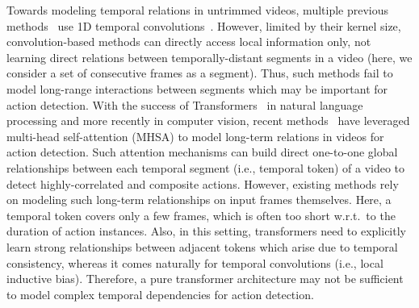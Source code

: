 \documentclass[10pt,twocolumn,letterpaper]{article}
\begin{document}
Towards modeling temporal relations in untrimmed videos, multiple previous methods~\cite{Dai_2021_WACV,dai2021ctrn,lea2017temporal,dai2019self,dai2019tan,TGM1} use 1D temporal convolutions~\cite{lea2017temporal}. However, limited by 
their kernel size, convolution-based methods can directly access local information only, not learning direct relations between temporally-distant segments in a video (here, we consider a set of consecutive frames as a segment). Thus, such methods fail to model long-range interactions between segments which may be important for action detection.
With the success of Transformers~\cite{transformer,zhu2020deformable,dosovitskiy2020image,liu2021swin} in natural language processing and more recently in computer vision, recent methods~\cite{MLAD,tan2021relaxed} have leveraged multi-head self-attention (MHSA) to model long-term relations in videos for action detection.
Such attention mechanisms can build direct one-to-one global relationships between each temporal segment (i.e., temporal token) of a video to detect highly-correlated and composite actions. However, existing methods rely on modeling such long-term relationships on input frames themselves. Here, a temporal token covers only a few frames, which is often too short w.r.t.~to the duration of action instances. Also, in this setting, transformers need to explicitly learn strong relationships between adjacent tokens which arise due to temporal consistency, whereas it comes naturally for temporal convolutions (i.e., local inductive bias).
Therefore, a pure transformer architecture
may not be sufficient to model complex temporal dependencies for action detection.
\end{document}
